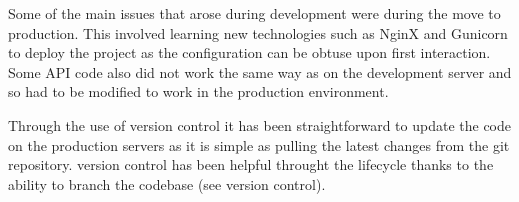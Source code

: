     \par
    Some of the main issues that arose during development were during the move to production. This involved learning new technologies such as NginX and Gunicorn to deploy the project as the configuration can be obtuse upon first interaction. Some API code also did not work the same way as on the development server and so had to be modified to work in the production environment.
    \par
    Through the use of version control it has been straightforward to update the code on the production servers as it is simple as pulling the latest changes from the git repository. version control has been helpful throught the lifecycle thanks to the ability to branch the codebase (see version control).
